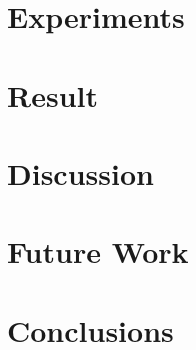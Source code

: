 \documentclass[tocnosub,noragright,centerchapter,fullpagesingle,12pt]{uiuc_csthesis21}
\theoremstyle{definition}
\numberwithin{algocf}{chapter}     %
\begin{document}
\chapter{Experiments}
\label{chp:exp}


\chapter{Result}
\label{chp:res}


\chapter{Discussion}
\label{chp:dis}


\chapter{Future Work}
\label{chp:fut}




\chapter{Conclusions}
\label{chp:concl}
  
\end{document}
